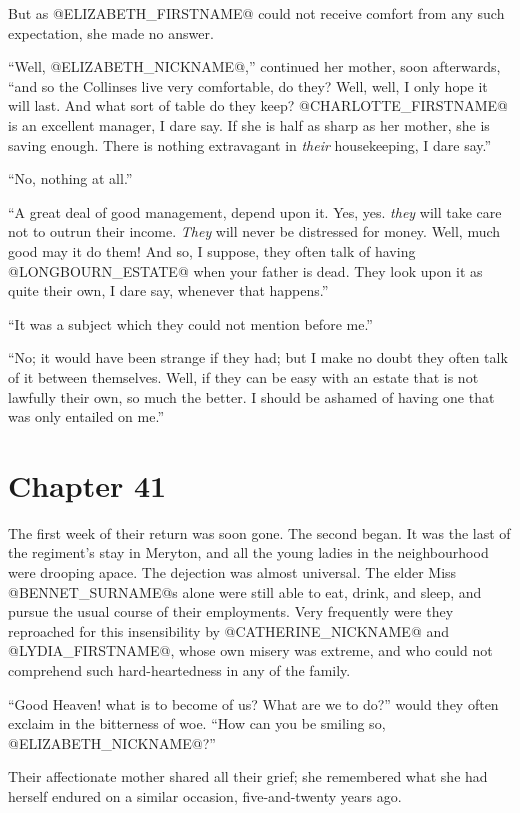 But as @ELIZABETH_FIRSTNAME@ could not receive comfort from any such expectation,
she made no answer.

``Well, @ELIZABETH_NICKNAME@,'' continued her mother, soon afterwards, ``and so the
Collinses live very comfortable, do they? Well, well, I only hope
it will last. And what sort of table do they keep? @CHARLOTTE_FIRSTNAME@ is an
excellent manager, I dare say. If she is half as sharp as her
mother, she is saving enough. There is nothing extravagant in \textit{their}
housekeeping, I dare say.''

``No, nothing at all.''

``A great deal of good management, depend upon it. Yes, yes. \textit{they} will
take care not to outrun their income. \textit{They} will never be distressed
for money. Well, much good may it do them! And so, I suppose, they often
talk of having @LONGBOURN_ESTATE@ when your father is dead. They look upon it as
quite their own, I dare say, whenever that happens.''

``It was a subject which they could not mention before me.''

``No; it would have been strange if they had; but I make no doubt they
often talk of it between themselves. Well, if they can be easy with an
estate that is not lawfully their own, so much the better. I should be
ashamed of having one that was only entailed on me.''



\chapter*{Chapter 41}


The first week of their return was soon gone. The second began. It was
the last of the regiment's stay in Meryton, and all the young ladies
in the neighbourhood were drooping apace. The dejection was almost
universal. The elder Miss @BENNET_SURNAME@s alone were still able to eat, drink,
and sleep, and pursue the usual course of their employments. Very
frequently were they reproached for this insensibility by @CATHERINE_NICKNAME@ and
@LYDIA_FIRSTNAME@, whose own misery was extreme, and who could not comprehend such
hard-heartedness in any of the family.

``Good Heaven! what is to become of us? What are we to do?'' would they
often exclaim in the bitterness of woe. ``How can you be smiling so,
@ELIZABETH_NICKNAME@?''

Their affectionate mother shared all their grief; she remembered what
she had herself endured on a similar occasion, five-and-twenty years
ago.

